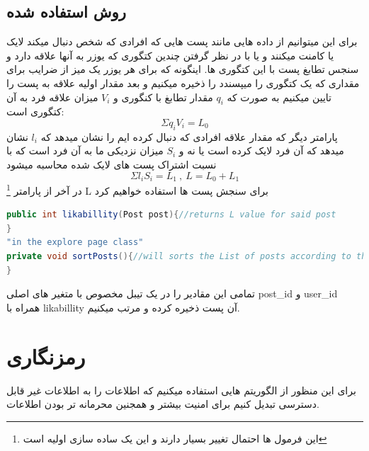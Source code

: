 \documentclass[12pt]{article}
\begin{document}
\subsection{روش استفاده شده}
برای این میتوانیم از داده هایی مانند پست هایی که افرادی که شخص
دنبال میکند لایک یا کامنت میکنند
و یا با در نظر گرفتن چندین کتگوری که یوزر به آنها علاقه دارد و
سنجس تطابغ پست با این کتگوری ها.
اینگونه که برای هر یوزر یک میز از ضرایب برای مقداری که یک کتگوری را
میپسندد را ذخیره میکنیم و بعد مقدار اولیه علاقه به پست را تایین
میکنیم به صورت که $q_i$ مقدار تطابغ با کنگوری و $V_i$ میزان
علاقه فرد به آن کتگوری است:
\Large
\[
    \varSigma q_i V_i = L_0
\]
\normalsize
پارامتر دیگر که مقدار علاقه افرادی که دنبال کرده ایم را نشان میدهد که
$l_i$ نشان میدهد که آن فرد لایک کرده است یا نه و $S_i$ میزان نزدیکی
ما به آن فرد است که با نسبت اشتراک پست های لایک شده محاسبه میشود
\Large
\[
    \varSigma l_i S_i = L_1\ ,\ L = L_0 + L_1
\]\footnote{این فرمول ها احتمال تغییر بسیار دارند و این یک ساده سازی اولیه است}
\normalsize
در آخر از پارامتر L برای سنجش پست ها استفاده خواهیم کرد\\
\begin{latin}
    \begin{lstlisting}[language=Java,label={lst:code}, mathescape=true, breaklines=true]
public int likabillity(Post post){//returns L value for said post
}
"in the explore page class"
private void sortPosts(){//will sorts the List of posts according to the L values
}
    \end{lstlisting}
\end{latin}
تمامی این مقادیر را در یک تیبل مخصوص با متغیر های اصلی post\_id و user\_id همراه با
likabillity آن پست ذخیره کرده و مرتب میکنیم.
\pagebreak
\section{رمزنگاری}
برای این منظور از الگوریتم هایی استفاده میکنیم که اطلاعات را به
اطلاعات غیر قابل دسترسی تبدیل کنیم برای امنیت بیشتر و همجنین محرمانه تر
بودن اطلاعات.
\end{document}
